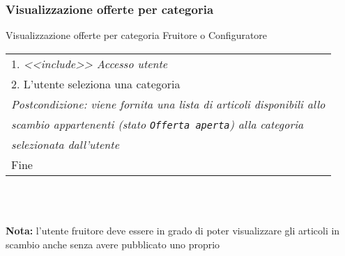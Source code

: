 \begin{minipage}{\textwidth}
    \subsubsection{Visualizzazione offerte per categoria}
    \usecase
        {Visualizzazione offerte per categoria}
        {
            Fruitore o Configuratore %
        }
        {
            \begin{tabular}{l}
                1. \textit{<<include>> Accesso utente}\\
                2. L'utente seleziona una categoria\\
                \textit{Postcondizione: viene fornita una lista di articoli disponibili allo}\\
                \textit{scambio appartenenti (stato \texttt{Offerta aperta}) alla categoria}\\
                \textit{selezionata dall'utente}\\
                Fine
            \end{tabular}\\

            \\


        }
        \vspace{0.5cm}
        \textbf{Nota:} l'utente fruitore deve essere in grado di poter visualizzare
        gli articoli in scambio anche senza avere pubblicato uno proprio
\end{minipage}